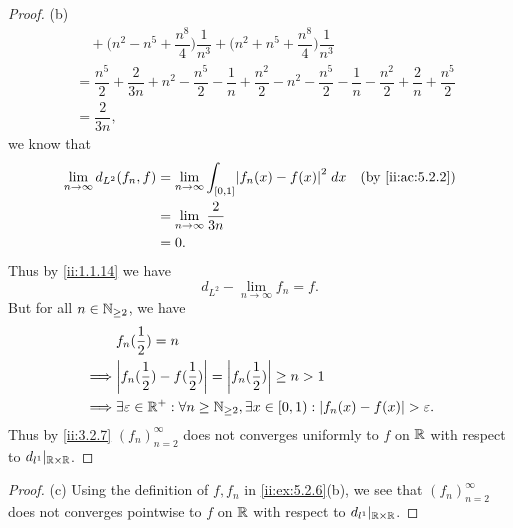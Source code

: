 \begin{proof}{(b)}
\begin{align*}
     & \quad + \bigg(n^2 - n^5 + \dfrac{n^8}{4}\bigg) \dfrac{1}{n^3} + \bigg(n^2 + n^5 + \dfrac{n^8}{4}\bigg) \dfrac{1}{n^3}                                                                                                                                                                                          \\
     & = \dfrac{n^5}{2} + \dfrac{2}{3n} + n^2 - \dfrac{n^5}{2} - \dfrac{1}{n} + \dfrac{n^2}{2} - n^2 - \dfrac{n^5}{2} - \dfrac{1}{n} - \dfrac{n^2}{2} + \dfrac{2}{n} + \dfrac{n^5}{2}                                                                                                                                 \\
     & = \dfrac{2}{3n},
  \end{align*}
  we know that
  \begin{align*}
    \lim_{n \to \infty} d_{L^2}(f_n, f) & = \lim_{n \to \infty} \int_{[0, 1]} \abs{f_n(x) - f(x)}^2 \; dx &  & \by{ii:ac:5.2.2} \\
                                        & = \lim_{n \to \infty} \dfrac{2}{3n}                                                   \\
                                        & = 0.
  \end{align*}
  Thus by \cref{ii:1.1.14} we have
  \[
    d_{L^2} - \lim_{n \to \infty} f_n = f.
  \]
  But for all \(n \in \mathbb{N}_{\geq 2}\), we have
  \begin{align*}
             & f_n(\dfrac{1}{2}) = n                                                                                                \\
    \implies & \abs{f_n(\dfrac{1}{2}) - f(\dfrac{1}{2})} = \abs{f_n(\dfrac{1}{2})} \geq n > 1                                       \\
    \implies & \exists \varepsilon \in \R^+ : \forall n \geq \N_{\geq 2}, \exists x \in [0, 1) : \abs{f_n(x) - f(x)} > \varepsilon.
  \end{align*}
  Thus by \cref{ii:3.2.7} \((f_n)_{n = 2}^\infty\) does not converges uniformly to \(f\) on \(\mathbb{R}\) with respect to \(d_{l^1}|_{\mathbb{R} \times \mathbb{R}}\).
\end{proof}

\begin{proof}{(c)}
  Using the definition of \(f, f_n\) in \cref{ii:ex:5.2.6}(b), we see that \((f_n)_{n = 2}^\infty\) does not converges pointwise to \(f\) on \(\mathbb{R}\) with respect to \(d_{l^1}|_{\mathbb{R} \times \mathbb{R}}\).
\end{proof}

